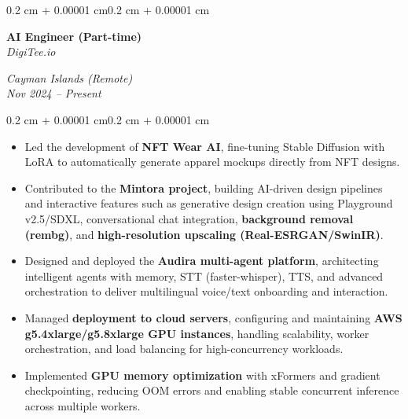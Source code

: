 \documentclass[10pt, letterpaper]{article}
\newenvironment{highlights}{
  \begin{itemize}[
    topsep=0.10 cm,
    parsep=0.10 cm,
    partopsep=0pt,
    itemsep=0pt,
    leftmargin=0.4 cm + 10pt
  ]}
  {\end{itemize}
}
\newenvironment{onecolentry}{
  \begin{adjustwidth}{0.2 cm + 0.00001 cm}{0.2 cm + 0.00001 cm}
}{
  \end{adjustwidth}
}
\newenvironment{twocolentry}[2][]{
  \onecolentry
  \def\secondColumn{#2}
  \setcolumnwidth{\fill, 4.5 cm}
  \begin{paracol}{2}
}{
  \switchcolumn \raggedleft \secondColumn
  \end{paracol}
  \endonecolentry
}
\begin{document}
\begin{twocolentry}{
  \textit{Cayman Islands (Remote)} \\
  \textit{Nov 2024 -- Present}}
  \textbf{AI Engineer (Part-time)} \\
  \textit{DigiTee.io}
\end{twocolentry}
\vspace{0.10 cm}
\begin{onecolentry}
  \begin{highlights}
    \item Led the development of \textbf{NFT Wear AI}, fine-tuning Stable Diffusion with LoRA to automatically generate apparel mockups directly from NFT designs.
    \item Contributed to the \textbf{Mintora project}, building AI-driven design pipelines and interactive features such as generative design creation using Playground v2.5/SDXL, conversational chat integration, \textbf{background removal (rembg)}, and \textbf{high-resolution upscaling (Real-ESRGAN/SwinIR)}.
    \item Designed and deployed the \textbf{Audira multi-agent platform}, architecting intelligent agents with memory, STT (faster-whisper), TTS, and advanced orchestration to deliver multilingual voice/text onboarding and interaction.
    \item Managed \textbf{deployment to cloud servers}, configuring and maintaining \textbf{AWS g5.4xlarge/g5.8xlarge GPU instances}, handling scalability, worker orchestration, and load balancing for high-concurrency workloads.
    \item Implemented \textbf{GPU memory optimization} with xFormers and gradient checkpointing, reducing OOM errors and enabling stable concurrent inference across multiple workers.
  \end{highlights}
\end{onecolentry}
\end{document}
